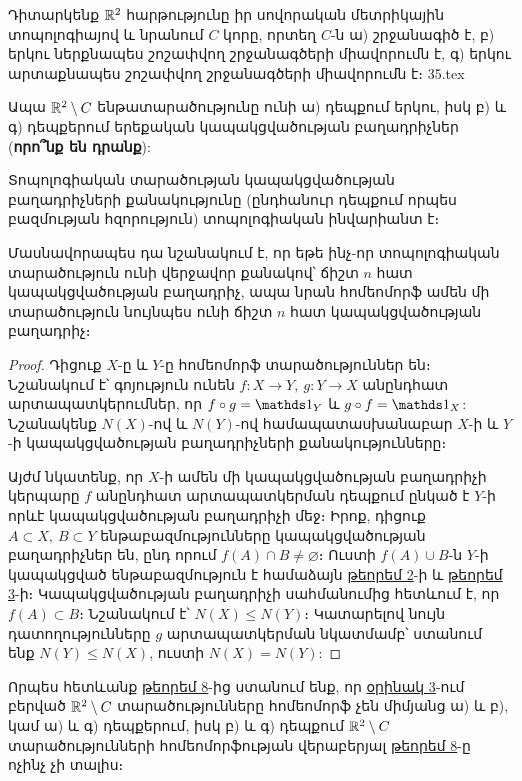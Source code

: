 \documentclass[./main.tex]{subfiles}
\begin{document}
\begin{example}\label{ch14ex3}
Դիտարկենք $\mathbb{R}^2$ հարթությունը իր սովորական մետրիկային տոպո\-լո\-գիայով և նրանում $C$ կորը, որտեղ $C$-ն ա) շրջանագիծ է, բ) երկու ներքնապես շոշափվող շրջանագծերի միավորումն է, գ) երկու արտաքնապես շոշափվող շրջա\-նագծերի միավորումն է։
{35.tex}
\par Ապա $\mathbb{R}^2 \setminus C$ ենթատարածությունը ունի ա) դեպքում երկու, իսկ բ) և գ) դեպ\-քե\-րում երեքական կապակցվածության բաղադրիչներ (\textbf{որո՞նք են դրանք}):
\end{example}
\begin{theorem}\label{ch14thm8}
\label{15:թեորեմ 8}
Տոպոլոգիական տարածության կապակցվածության բաղադրիչների քանակությունը (ընդհանուր դեպքում որպես բազմության հզորություն) տոպո\-լո\-գի\-ա\-կան ինվարիանտ է։
\par Մասնավորապես դա նշանակում է, որ եթե ինչ-որ տոպոլոգիական տարածու\-թ\-յուն ունի վերջավոր քանակով՝ ճիշտ $n$ հատ կապակցվա\-ծության բաղադրիչ, ապա նրան հոմեոմորֆ ամեն մի տարածություն նույնպես ունի ճիշտ $n$ հատ կապակցվա\-ծության բաղադրիչ։
\end{theorem}
\begin{proof}
Դիցուք $X$-ը և $Y$-ը հոմեոմորֆ տարածություններ են։ Նշանակում է՝ գոյություն ունեն $f:X \rightarrow Y,\ g:Y \rightarrow X$ անընդհատ արտապատկերումներ, որ $f \circ g=\nuynakan_Y$ և $g \circ f=\nuynakan_X$: Նշանակենք $N(X)$-ով և $N(Y)$-ով համապատասխանաբար $X$-ի և $Y$-ի կապակցվածության բաղադրիչների քանակությունները։
\par Այժմ նկատենք, որ $X$-ի ամեն մի կապակցվածության բաղադրիչի կերպարը $f$ անընդհատ արտապատկերման դեպքում ընկած է $Y$-ի որևէ կապակցվածության բաղադրիչի մեջ։ Իրոք, դիցուք $A \subset X,\ B \subset Y$ ենթաբազմությունները կապակց\-վա\-ծության բաղադրիչներ են, ընդ որում $f(A) \cap B \neq \varnothing$։ Ուստի $f(A) \cup B$-ն $Y$-ի կա\-պա\-կցված ենթաբազմություն է համաձայն \hyperref[15:թեորեմ 2]{թեորեմ 2}-ի և \hyperref[15:թեորեմ 3]{թեորեմ 3}-ի։ Կապակց\-վա\-ծու\-թյան բաղադրիչի սահմանումից հետևում է, որ $f(A) \subset B$։ Նշանակում է՝ $N(X)\leq N(Y)$։ Կատարելով նույն դատողությունները $g$ արտապատկերման նկատ\-մամբ՝ ստանում ենք $N(Y)\leq N(X)$, ուստի $N(X)=N(Y)$: 
\end{proof}
\par Որպես հետևանք \hyperref[15:թեորեմ 8]{թեորեմ 8}-ից ստանում ենք, որ \hyperref[15:օրինակ 3]{օրինակ 3}-ում բերված $\mathbb{R}^2 \setminus C$ տարածությունները հոմեոմորֆ չեն միմյանց ա) և բ), կամ ա) և գ) դեպքերում, իսկ բ) և գ) դեպքում $\mathbb{R}^2 \setminus C$ տարածություն\-ների հոմեոմորֆության վերաբերյալ \hyperref[15:թեորեմ 8]{թեորեմ 8}-ը ոչինչ չի տալիս։
\end{document}

